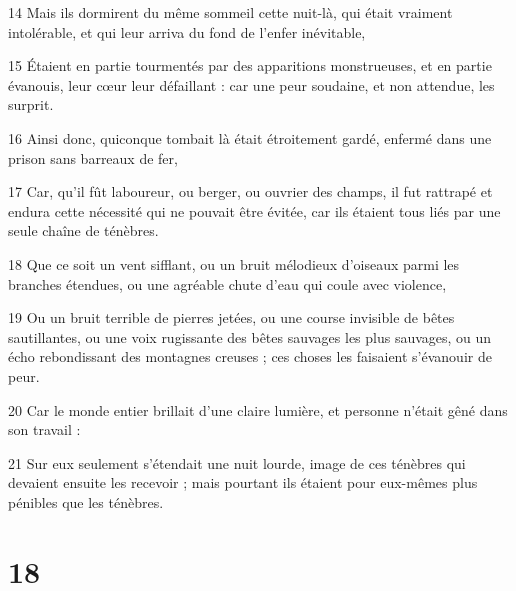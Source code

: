 \par 14 Mais ils dormirent du même sommeil cette nuit-là, qui était vraiment intolérable, et qui leur arriva du fond de l'enfer inévitable,
\par 15 Étaient en partie tourmentés par des apparitions monstrueuses, et en partie évanouis, leur cœur leur défaillant : car une peur soudaine, et non attendue, les surprit.
\par 16 Ainsi donc, quiconque tombait là était étroitement gardé, enfermé dans une prison sans barreaux de fer,
\par 17 Car, qu'il fût laboureur, ou berger, ou ouvrier des champs, il fut rattrapé et endura cette nécessité qui ne pouvait être évitée, car ils étaient tous liés par une seule chaîne de ténèbres.
\par 18 Que ce soit un vent sifflant, ou un bruit mélodieux d'oiseaux parmi les branches étendues, ou une agréable chute d'eau qui coule avec violence,
\par 19 Ou un bruit terrible de pierres jetées, ou une course invisible de bêtes sautillantes, ou une voix rugissante des bêtes sauvages les plus sauvages, ou un écho rebondissant des montagnes creuses ; ces choses les faisaient s’évanouir de peur.
\par 20 Car le monde entier brillait d'une claire lumière, et personne n'était gêné dans son travail :
\par 21 Sur eux seulement s'étendait une nuit lourde, image de ces ténèbres qui devaient ensuite les recevoir ; mais pourtant ils étaient pour eux-mêmes plus pénibles que les ténèbres.

\chapter{18}

